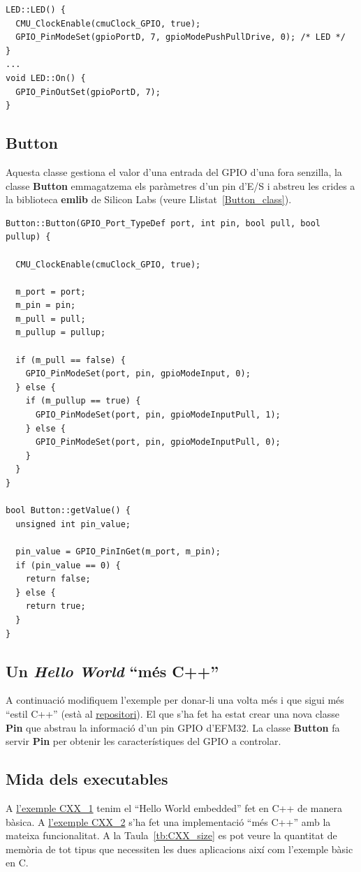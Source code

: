  \begin{lstlisting}[caption={Part del codi de la classe LED},style=customc,label=LED_class]
LED::LED() {
  CMU_ClockEnable(cmuClock_GPIO, true);
  GPIO_PinModeSet(gpioPortD, 7, gpioModePushPullDrive, 0); /* LED */
}
...
void LED::On() {
  GPIO_PinOutSet(gpioPortD, 7);
}
\end{lstlisting}


\subsection{Button}
Aquesta classe gestiona el valor d'una entrada del \gls{GPIO} d'una fora senzilla, la classe {\bf Button} emmagatzema els paràmetres d'un pin d'E/S i abstreu les crides a la biblioteca {\bf emlib} de Silicon Labs (veure Llistat~\ref{Button_class}).

\begin{lstlisting}[caption={Part del codi de la classe LED},style=customc,label=Button_class]
Button::Button(GPIO_Port_TypeDef port, int pin, bool pull, bool pullup) {

  CMU_ClockEnable(cmuClock_GPIO, true);

  m_port = port;
  m_pin = pin;
  m_pull = pull;
  m_pullup = pullup;

  if (m_pull == false) {
    GPIO_PinModeSet(port, pin, gpioModeInput, 0);
  } else {
    if (m_pullup == true) {
      GPIO_PinModeSet(port, pin, gpioModeInputPull, 1);
    } else {
      GPIO_PinModeSet(port, pin, gpioModeInputPull, 0);
    }
  }
}

bool Button::getValue() {
  unsigned int pin_value;

  pin_value = GPIO_PinInGet(m_port, m_pin);
  if (pin_value == 0) {
    return false;
  } else {
    return true;
  }
}
\end{lstlisting}

\subsection{Un {\em Hello World} ``més C++''}
A continuació modifiquem l'exemple per donar-li una volta més i que sigui més ``estil C++'' (està al \href{https://github.com/mariusmm/cursembedded/tree/master/Simplicity/CXX_2}{repositori}). El que s'ha fet ha estat crear una nova classe {\bf Pin} que abstrau la informació d'un pin GPIO d'EFM32. La classe {\bf Button} fa servir {\bf Pin} per obtenir les característiques del GPIO a controlar.

\subsection{Mida dels executables}
\label{CXX_size}
A \href{https://github.com/mariusmm/cursembedded/tree/master/Simplicity/CXX_1}{l'exemple CXX\_1} tenim el ``Hello World embedded'' fet en C++ de manera bàsica. A \href{https://github.com/mariusmm/cursembedded/tree/master/Simplicity/CXX_2}{l'exemple CXX\_2} s'ha fet una implementació ``més C++'' amb la mateixa funcionalitat. A la Taula~\ref{tb:CXX_size} es pot veure la quantitat de memòria de tot tipus que necessiten les dues aplicacions així com l'exemple bàsic en C.

